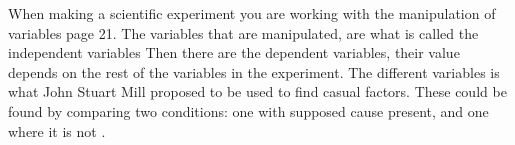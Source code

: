 When making a scientific experiment you are working with the manipulation of variables \citep{Design} page 21. The variables that are manipulated, are what is called the independent variables \citep{Design} 
Then there are the dependent variables, their value depends on the rest of the variables in the experiment. The different variables is what John Stuart Mill proposed to be used to find casual factors. These could be found by comparing two conditions: one with supposed cause present, and one where it is not \citep{Design}.